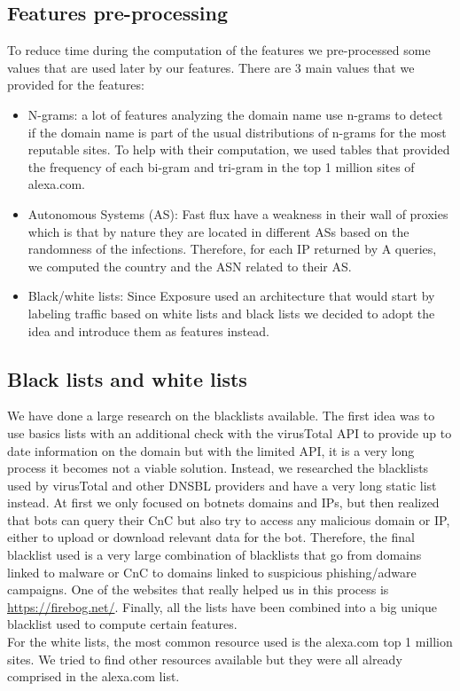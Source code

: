 \subsection{Features pre-processing}
To reduce time during the computation of the features we pre-processed some values that are used later by our features. There are 3 main values that we provided for the features:
\begin{itemize}
\item N-grams: a lot of features analyzing the domain name use n-grams to detect if the domain name is part of the usual distributions of n-grams for the most reputable sites. To help with their computation, we used tables that provided the frequency of each bi-gram and tri-gram in the top 1 million sites of alexa.com.
\item Autonomous Systems (AS): Fast flux have a weakness in their wall of proxies which is that by nature they are located in different ASs based on the randomness of the infections. Therefore, for each IP returned by A queries, we computed the country and the ASN related to their AS.
\item Black/white lists: Since Exposure used an architecture that would start by labeling traffic based on white lists and black lists we decided to adopt the idea and introduce them as features instead. \\
\end{itemize}

\subsection{Black lists and white lists}
We have done a large research on the blacklists available. The first idea was to use basics lists with an additional check with the virusTotal API to provide up to date information on the domain but with the limited API, it is a very long process it becomes not a viable solution. Instead, we researched the blacklists used by virusTotal and other DNSBL providers and have a very long static list instead.
At first we only focused on botnets domains and IPs, but then realized that bots can query their CnC but also try to access any malicious domain or IP, either to upload or download relevant data for the bot. Therefore, the final blacklist used is a very large combination of blacklists that go from domains linked to malware or CnC to domains linked to suspicious phishing/adware campaigns. One of the websites that really helped us in this process is \url{https://firebog.net/}. Finally, all the lists have been combined into a big unique blacklist used to compute certain features.\\
For the white lists, the most common resource used is the alexa.com top 1 million sites. We tried to find other resources available but they were all already comprised in the alexa.com list. 
